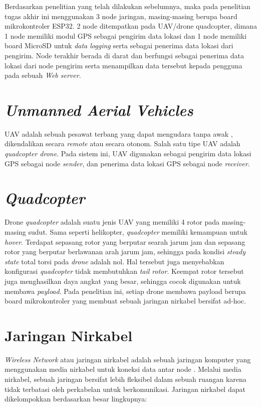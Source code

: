 Berdasarkan penelitian yang telah dilakukan sebelumnya, maka pada penelitian tugas akhir ini menggunakan 3 node jaringan, masing-masing berupa board mikrokontroler ESP32. 2 node ditempatkan pada UAV/drone quadcopter, dimana 1 node memiliki modul GPS sebagai pengirim data lokasi dan 1 node memiliki board MicroSD untuk \textit{data logging} serta sebagai penerima data lokasi dari pengirim. Node terakhir berada di darat dan berfungsi sebagai penerima data lokasi dari node pengirim serta menampilkan data tersebut kepada pengguna pada sebuah \textit{Web server}.

\section{\textit{Unmanned Aerial Vehicles}}
UAV adalah sebuah pesawat terbang yang dapat mengudara tanpa awak \cite{lakshminarayananJointNetworkDisaster2015}, dikendalikan secara \textit{remote} atau secara otonom. Salah satu tipe UAV adalah \textit{quadcopter drone}. Pada sistem ini, UAV digunakan sebagai pengirim data lokasi GPS sebagai node \textit{sender}, dan penerima data lokasi GPS sebagai node \textit{receiver}.

\section{\textit{Quadcopter}}
Drone \textit{quadcopter} adalah suatu jenis UAV yang memiliki 4 rotor pada masing-masing sudut. Sama seperti helikopter, \textit{quadcopter} memiliki kemampuan untuk \textit{hover}. Terdapat sepasang rotor yang berputar searah jarum jam dan sepasang rotor yang berputar berlawanan arah jarum jam, sehingga pada kondisi \textit{steady state} total torsi pada \textit{drone} adalah nol. Hal tersebut juga menyebabkan konfigurasi \textit{quadcopter} tidak membutuhkan \textit{tail rotor}. Keempat rotor tersebut juga menghasilkan daya angkat yang besar, sehingga cocok digunakan untuk membawa \textit{payload}. Pada penelitian ini, setiap drone membawa payload berupa board mikrokontroler yang membuat sebuah jaringan nirkabel bersifat ad-hoc.

\section{Jaringan Nirkabel}
\textit{Wireless Network} atau jaringan nirkabel adalah sebuah jaringan komputer yang menggunakan media nirkabel untuk koneksi data antar node \cite{designing_a_wireless_network}. Melalui media nirkabel, sebuah jaringan bersifat lebih fleksibel dalam sebuah ruangan karena tidak terbatasi oleh perkabelan untuk berkomunikasi. Jaringan nirkabel dapat dikelompokkan berdasarkan besar lingkupnya:
